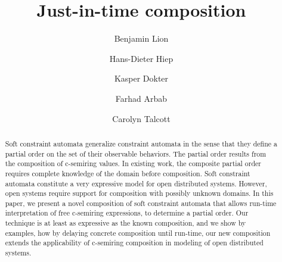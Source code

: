 \title{Just-in-time composition}
\author{Benjamin Lion \and Hans-Dieter Hiep \and Kasper Dokter \and Farhad Arbab \and Carolyn Talcott}



\maketitle

\begin{abstract}

	
	
	
	Soft constraint automata generalize constraint automata in the sense that they define a partial order on the set of their observable behaviors. The partial order results from the composition of c-semiring values. In existing work, the composite partial order requires complete knowledge of the domain before composition. Soft constraint automata constitute a very expressive model for open distributed systems. However, open systems require support for composition with possibly unknown domains. In this paper, we present a novel composition of soft constraint automata that allows run-time interpretation of free c-semiring expressions, to determine a partial order. Our technique is at least as expressive as the known composition, and we show by examples, how by delaying concrete composition until run-time, our new composition extends the applicability of c-semiring composition in modeling of open distributed systems.
	
	
	
	
	


\end{abstract}
